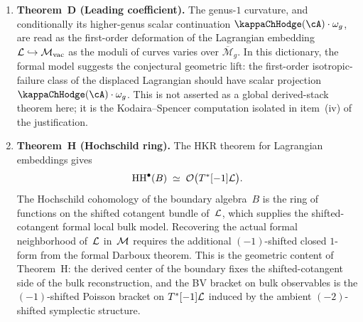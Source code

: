 \begin{interpretation}
\begin{enumerate}[label=\textup{(\roman*)},leftmargin=2em]
\item \textbf{Theorem~D \textup{(}Leading coefficient\textup{)}.}
 The genus-$1$ curvature, and conditionally its higher-genus
 scalar continuation\/ $\kappaChHodge(\cA) \cdot \omega_g$, are read as
 the first-order deformation of the
 Lagrangian embedding\/ $\mathcal L \hookrightarrow \mathcal M_{\mathrm{vac}}$
 as the moduli of curves varies over\/ $\overline{\mathcal M}_g$.
 In this dictionary, the formal model suggests the conjectural
 geometric lift: the first-order isotropic-failure class of the
 displaced Lagrangian should have scalar projection
 $\kappaChHodge(\cA) \cdot \omega_g$.  This is not asserted as a
 global derived-stack theorem here; it is the Kodaira--Spencer
 computation isolated in item~\textup{(iv)} of the justification.

\item \textbf{Theorem~H \textup{(}Hochschild ring\textup{)}.}
 The HKR theorem for Lagrangian embeddings gives
 \[
 \operatorname{HH}^\bullet(B)
 \;\simeq\;
 \mathcal{O}\bigl(T^*[-1]\mathcal L\bigr).
 \]
 The Hochschild cohomology of the boundary algebra~$B$ is the
 ring of functions on the shifted cotangent bundle of~$\mathcal L$,
 which supplies the shifted-cotangent formal local bulk model.
 Recovering the actual formal neighborhood of~$\mathcal L$ in~$\mathcal M$
 requires the additional $(-1)$-shifted closed $1$-form from the
 formal Darboux theorem. This is the geometric content of
 Theorem~H: the derived center of the boundary fixes the
 shifted-cotangent side of the bulk reconstruction, and the BV
 bracket on bulk observables is the $(-1)$-shifted Poisson bracket
 on $T^*[-1]\mathcal L$ induced by the ambient $(-2)$-shifted symplectic
 structure.
\end{enumerate}
\end{interpretation}


